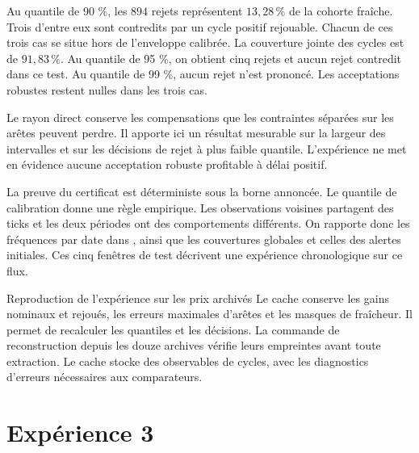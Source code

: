 \begin{table}[H]
\centering\small

\caption{Sensibilité de la règle par cycles, juillet et délai de 100 ms. Un rejet contredit est un instant où un cycle aux étapes rejouables à une seconde donne ensuite un gain positif.}
\label{tab:experience-deux-sensibilite}
\end{table}

Au quantile de 90 \%, les \(894\) rejets représentent \(13{,}28\,\%\) de la cohorte fraîche. Trois d'entre eux sont contredits par un cycle positif rejouable. Chacun de ces trois cas se situe hors de l'enveloppe calibrée. La couverture jointe des cycles est de \(91{,}83\,\%\). Au quantile de 95 \%, on obtient cinq rejets et aucun rejet contredit dans ce test. Au quantile de 99 \%, aucun rejet n'est prononcé. Les acceptations robustes restent nulles dans les trois cas.

Le rayon direct conserve les compensations que les contraintes séparées sur les arêtes peuvent perdre. Il apporte ici un résultat mesurable sur la largeur des intervalles et sur les décisions de rejet à plus faible quantile. L'expérience ne met en évidence aucune acceptation robuste profitable à délai positif.

La preuve du certificat est déterministe sous la borne annoncée. Le quantile de calibration donne une règle empirique. Les observations voisines partagent des ticks et les deux périodes ont des comportements différents. On rapporte donc les fréquences par date dans , ainsi que les couvertures globales et celles des alertes initiales. Ces cinq fenêtres de test décrivent une expérience chronologique sur ce flux.

\begin{callout}{Reproduction de l'expérience sur les prix archivés}
Le cache  conserve les gains nominaux et rejoués, les erreurs maximales d'arêtes et les masques de fraîcheur. Il permet de recalculer les quantiles et les décisions. La commande de reconstruction depuis les douze archives vérifie leurs empreintes avant toute extraction. Le cache stocke des observables de cycles, avec les diagnostics d'erreurs nécessaires aux comparateurs.
\end{callout}

\clearpage
\part{Expérience 3}
